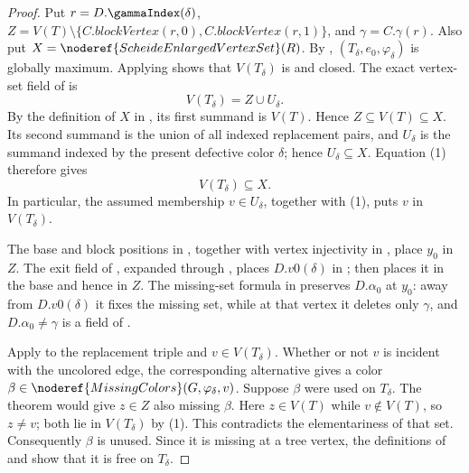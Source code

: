 \begin{proof}
Put $r=D.\gammaIndex(\delta)$,
$Z=V(T)\setminus\{C.\mathit{blockVertex}(r,0),
C.\mathit{blockVertex}(r,1)\}$, and
$\gamma=C.\gamma(r)$.  Also put
$X=\noderef{ScheideEnlargedVertexSet}(R)$.  By
,
$(T_\delta,e_0,\varphi_\delta)$ is globally maximum.  Applying
 shows that $V(T_\delta)$ is
 and closed.  The exact vertex-set
field of  is
\[
 V(T_\delta)=Z\cup U_\delta.                              \tag{1}
\]
By the definition of $X$ in , its first
summand is $V(T)$.  Hence
$Z\subseteq V(T)\subseteq X$.  Its second summand is the union of all
indexed replacement pairs, and $U_\delta$ is the summand indexed by the
present defective color $\delta$; hence $U_\delta\subseteq X$.  Equation
(1) therefore gives
\[
                 V(T_\delta)\subseteq X.                    \tag{2}
\]
In particular, the assumed membership $v\in U_\delta$, together with
(1), puts $v$ in $V(T_\delta)$.

The base and block positions in
, together with vertex
injectivity in , place $y_0$ in $Z$.  The exit
field of , expanded through
, places $D.v0(\delta)$ in
; 
then places it in the base and hence in $Z$.  The missing-set formula in
 preserves $D.\alpha_0$ at $y_0$:
away from $D.v0(\delta)$ it fixes the missing set, while at that vertex
it deletes only $\gamma$, and
$D.\alpha_0\ne\gamma$ is a field of
.

Apply  to the replacement
triple and $v\in V(T_\delta)$.  Whether or not $v$ is incident with the
uncolored edge, the corresponding alternative gives a color
$\beta\in\noderef{MissingColors}(G,\varphi_\delta,v)$.  Suppose $\beta$
were used on $T_\delta$.  The theorem
 would give $z\in Z$ also missing
$\beta$.  Here $z\in V(T)$ while $v\notin V(T)$, so $z\ne v$; both lie in
$V(T_\delta)$ by (1).  This contradicts the elementariness of that set.
Consequently $\beta$ is unused.  Since it is missing at a tree vertex,
the definitions of  and
 show that it is free on $T_\delta$.


\end{proof}
